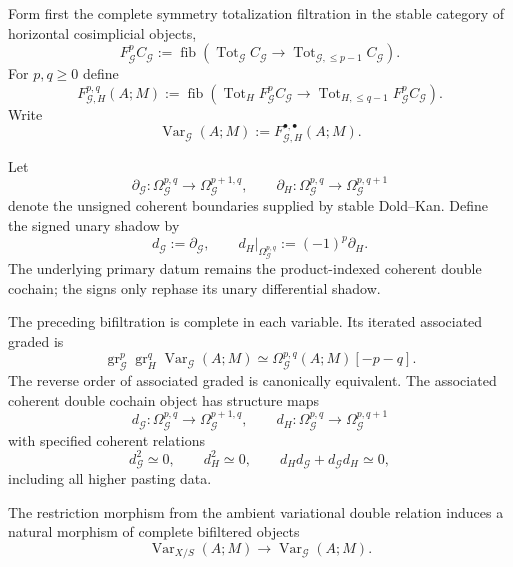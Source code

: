 \begin{definition}
\label{def:symmetry-noether-complete-symmetry-horizontal-bifiltration}
Form first the complete symmetry totalization filtration in the stable category of
horizontal cosimplicial objects,
\[
F^p_{\mathcal G}C_{\mathcal G}
:=
\operatorname{fib}
\left(
\operatorname{Tot}_{\mathcal G}C_{\mathcal G}
\longrightarrow
\operatorname{Tot}_{\mathcal G,\le p-1}C_{\mathcal G}
\right).
\]
For $p,q\ge0$ define
\[
F^{p,q}_{\mathcal G,H}(A;M)
:=
\operatorname{fib}
\left(
\operatorname{Tot}_H F^p_{\mathcal G}C_{\mathcal G}
\longrightarrow
\operatorname{Tot}_{H,\le q-1}F^p_{\mathcal G}C_{\mathcal G}
\right).
\]
Write
\[
\operatorname{Var}_{\mathcal G}(A;M)
:=
F^{\bullet,\bullet}_{\mathcal G,H}(A;M).
\]
\end{definition}

Let
\[
\partial_{\mathcal G}:
\Omega_{\mathcal G}^{p,q}
\longrightarrow
\Omega_{\mathcal G}^{p+1,q},
\qquad
\partial_H:
\Omega_{\mathcal G}^{p,q}
\longrightarrow
\Omega_{\mathcal G}^{p,q+1}
\]
denote the unsigned coherent boundaries supplied by stable Dold--Kan.  Define the
signed unary shadow by
\[
\boxed{
 d_{\mathcal G}:=\partial_{\mathcal G},
 \qquad
 d_H|_{\Omega_{\mathcal G}^{p,q}}
 :=(-1)^p\partial_H.
}
\]
The underlying primary datum remains the product-indexed coherent double cochain;
the signs only rephase its unary differential shadow.

\begin{theorem}
\label{thm:symmetry-noether-complete-symmetry-horizontal-coherent-calculus}
The preceding bifiltration is complete in each variable.  Its iterated associated
graded is
\[
\operatorname{gr}_{\mathcal G}^p
\operatorname{gr}_H^q
\operatorname{Var}_{\mathcal G}(A;M)
\simeq
\Omega_{\mathcal G}^{p,q}(A;M)[-p-q].
\]
The reverse order of associated graded is canonically equivalent.  The associated
coherent double cochain object has structure maps
\[
d_{\mathcal G}:
\Omega_{\mathcal G}^{p,q}
\longrightarrow
\Omega_{\mathcal G}^{p+1,q},
\qquad
d_H:
\Omega_{\mathcal G}^{p,q}
\longrightarrow
\Omega_{\mathcal G}^{p,q+1}
\]
with specified coherent relations
\[
d_{\mathcal G}^2\simeq0,
\qquad
d_H^2\simeq0,
\qquad
d_Hd_{\mathcal G}+d_{\mathcal G}d_H\simeq0,
\]
including all higher pasting data.

The restriction morphism from the ambient variational double relation induces a
natural morphism of complete bifiltered objects
\[
\operatorname{Var}_{X/S}(A;M)
\longrightarrow
\operatorname{Var}_{\mathcal G}(A;M).
\]
\end{theorem}

